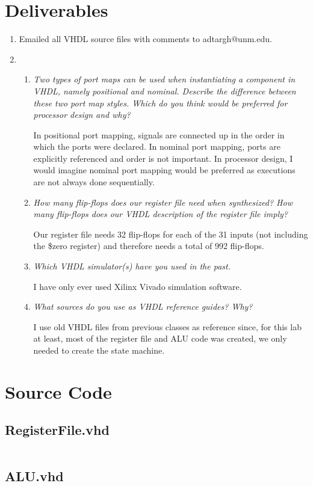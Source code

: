 \documentclass{article}
\begin{document}
\section*{Deliverables}
\begin{enumerate}

\item Emailed all VHDL source files with comments to adtargh@unm.edu.

\item
\begin{enumerate}
\item \textit{Two types of port maps can be used when instantiating a component in VHDL, namely positional and nominal.
Describe the difference between these two port map styles.
Which do you think would be preferred for processor design and why?}

In positional port mapping, signals are connected up in the order in which the ports were declared. In nominal port mapping, ports are explicitly referenced and order is not important. In processor design, I would imagine nominal port mapping would be preferred as executions are not always done sequentially.

\item \textit{How many flip-flops does our register file need when synthesized? How many flip-flops does our VHDL description of the register file imply?}

Our register file needs 32 flip-flops for each of the 31 inputs (not including the \$zero register) and therefore needs a total of 992 flip-flops.

\item \textit{Which VHDL simulator(s) have you used in the past.}

I have only ever used Xilinx Vivado simulation software.

\item \textit{What sources do you use as VHDL reference guides? Why?}

I use old VHDL files from previous classes as reference since, for this lab at least, most of the register file and ALU code was created, we only needed to create the state machine.

\end{enumerate}
\end{enumerate}

\newpage
\section*{Source Code}
\subsection*{RegisterFile.vhd}
\inputminted[frame=lines, linenos]{vhdl}{RegisterFile.vhd}

\newpage
\subsection*{ALU.vhd}
\inputminted[frame=lines, linenos]{vhdl}{ALU.vhd}
\end{document}
